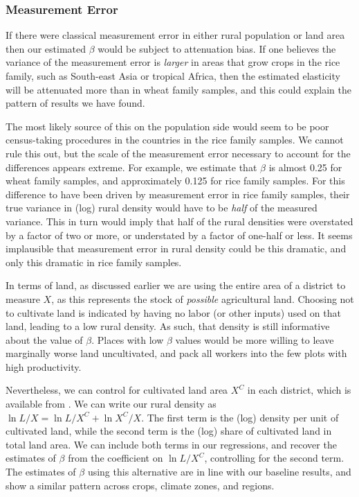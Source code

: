 \documentclass[11pt]{article}
\begin{document}
\subsubsection{Measurement Error} 
If there were classical measurement error in either rural population or land area then our estimated $\beta$ would be subject to attenuation bias. If one believes the variance of the measurement error is \textit{larger} in areas that grow crops in the rice family, such as South-east Asia or tropical Africa, then the estimated elasticity will be attenuated more than in wheat family samples, and this could explain the pattern of results we have found. 

The most likely source of this on the population side would seem to be poor census-taking procedures in the countries in the rice family samples. We cannot rule this out, but the scale of the measurement error necessary to account for the differences appears extreme. For example, we estimate that $\beta$ is almost 0.25 for wheat family samples, and approximately 0.125 for rice family samples. For this difference to have been driven by measurement error in rice family samples, their true variance in (log) rural density would have to be \textit{half} of the measured variance. This in turn would imply that half of the rural densities were overstated by a factor of two or more, or understated by a factor of one-half or less. It seems implausible that measurement error in rural density could be this dramatic, and only this dramatic in rice family samples.

In terms of land, as discussed earlier we are using the entire area of a district to measure $X$, as this represents the stock of \textit{possible} agricultural land. Choosing not to cultivate land is indicated by having no labor (or other inputs) used on that land, leading to a low rural density. As such, that density is still informative about the value of $\beta$. Places with low $\beta$ values would be more willing to leave marginally worse land uncultivated, and pack all workers into the few plots with high productivity. 

Nevertheless, we can control for cultivated land area $X^C$ in each district, which is available from \cite{gaez}. We can write our rural density as $\ln L/X = \ln L/X^C + \ln X^C/X$. The first term is the (log) density per unit of cultivated land, while the second term is the (log) share of cultivated land in total land area. We can include both terms in our regressions, and recover the estimates of $\beta$ from the coefficient on $\ln L/X^C$, controlling for the second term. The estimates of $\beta$ using this alternative are in line with our baseline results, and show a similar pattern across crops, climate zones, and regions. 
\end{document}

